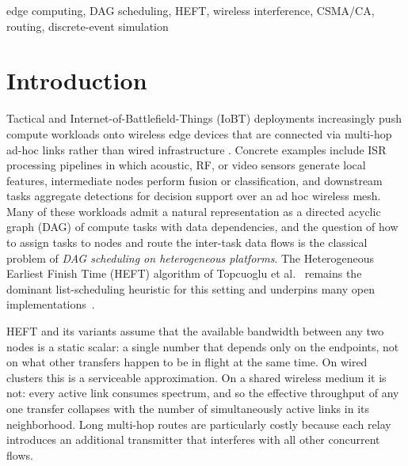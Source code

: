 \documentclass[conference]{IEEEtran}
\begin{document}
\begin{IEEEkeywords}
edge computing, DAG scheduling, HEFT, wireless interference, CSMA/CA, routing,
discrete-event simulation
\end{IEEEkeywords}

\section{Introduction}
\label{sec:intro}

Tactical and Internet-of-Battlefield-Things (IoBT) deployments increasingly
push compute workloads onto wireless edge devices that are connected via
multi-hop ad-hoc links rather than wired infrastructure
\cite{kott2016iobt,satyanarayanan2017edge}. Concrete examples include ISR
processing pipelines in which acoustic, RF, or video sensors generate local
features, intermediate nodes perform fusion or classification, and
downstream tasks aggregate detections for decision support over an ad hoc
wireless mesh. Many of these workloads admit a
natural representation as a directed acyclic graph (DAG) of compute tasks with
data dependencies, and the question of how to assign tasks to nodes and route
the inter-task data flows is the classical problem of \emph{DAG scheduling on
heterogeneous platforms}. The Heterogeneous Earliest Finish Time (HEFT)
algorithm of Topcuoglu et al.~\cite{topcuoglu2002heft} remains the dominant
list-scheduling heuristic for this setting and underpins many open
implementations~\cite{coleman2024saga}.

HEFT and its variants assume that the available bandwidth between any two
nodes is a static scalar: a single number that depends only on the
endpoints, not on what other transfers happen to be in flight at the same
time. On wired clusters this is a serviceable approximation. On a shared
wireless medium it is not: every active link consumes spectrum, and so the
effective throughput of any one transfer collapses with the number of
simultaneously active links in its neighborhood. Long multi-hop routes are
particularly costly because each relay introduces an additional transmitter
that interferes with all other concurrent flows.
\end{document}
